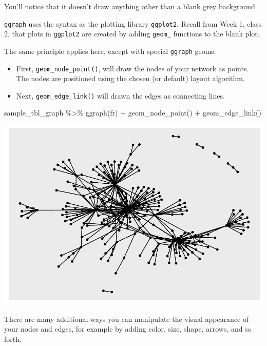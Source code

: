 \documentclass[
]{book}
\newenvironment{Shaded}{\begin{snugshade}}{\end{snugshade}}
\newcommand{\FunctionTok}[1]{\textcolor[rgb]{0.00,0.00,0.00}{#1}}
\newcommand{\NormalTok}[1]{#1}
\newcommand{\SpecialCharTok}[1]{\textcolor[rgb]{0.00,0.00,0.00}{#1}}
\newcommand{\StringTok}[1]{\textcolor[rgb]{0.31,0.60,0.02}{#1}}
\begin{document}
You'll notice that it doesn't draw anything other than a blank grey background.

\texttt{ggraph} uses the syntax as the plotting library \texttt{ggplot2}. Recall from Week 1, class 2, that plots in \texttt{ggplot2} are created by adding \texttt{geom\_} functions to the blank plot.

The same principle applies here, except with special \texttt{ggraph} geoms:

\begin{itemize}
\item
  First, \texttt{geom\_node\_point()}, will draw the nodes of your network as points. The nodes are positioned using the chosen (or default) layout algorithm.
\item
  Next, \texttt{geom\_edge\_link()} will drawn the edges as connecting lines.
\end{itemize}

\begin{Shaded}
\begin{Highlighting}[]
\NormalTok{sample\_tbl\_graph }\SpecialCharTok{\%\textgreater{}\%} 
  \FunctionTok{ggraph}\NormalTok{(}\StringTok{\textquotesingle{}fr\textquotesingle{}}\NormalTok{) }\SpecialCharTok{+} 
  \FunctionTok{geom\_node\_point}\NormalTok{() }\SpecialCharTok{+} 
  \FunctionTok{geom\_edge\_link}\NormalTok{()}
\end{Highlighting}
\end{Shaded}

\includegraphics{_main_files/figure-latex/unnamed-chunk-59-1.pdf}

There are many additional ways you can manipulate the visual appearance of your nodes and edges, for example by adding color, size, shape, arrows, and so forth.
\end{document}
